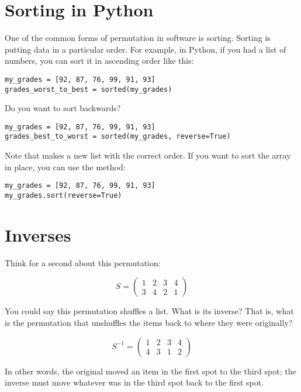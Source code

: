 \section{Sorting in Python}

One of the common forms of permutation in software is sorting.
Sorting is putting data in a particular order. For example, in Python,
if you had a list of numbers, you can sort it in ascending order like
this:

\begin{Verbatim}
my_grades = [92, 87, 76, 99, 91, 93]
grades_worst_to_best = sorted(my_grades)
\end{Verbatim}

Do you want to sort backwards?

\begin{Verbatim}
my_grades = [92, 87, 76, 99, 91, 93]
grades_best_to_worst = sorted(my_grades, reverse=True)
\end{Verbatim}

Note that  makes a new list with the correct
order. If you want to sort the array in place, you can use the
 method:

\begin{Verbatim}
my_grades = [92, 87, 76, 99, 91, 93]
my_grades.sort(reverse=True)
\end{Verbatim}

\section{Inverses}

Think for a second about this permutation:

$$S = \begin{pmatrix}
  1 & 2 & 3 & 4 \\
  3 & 4 & 2 & 1
\end{pmatrix}$$

You could say this permutation shuffles a list.  What is its
inverse? That is, what is the permutation that unshuffles the items
back to where they were originally?

$$S^{-1} = \begin{pmatrix}
  1 & 2 & 3 & 4 \\
  4 & 3 & 1 & 2
\end{pmatrix}$$

In other words, the original moved an item in the first spot to the third
spot; the inverse must move whatever was in the third spot back to
the first spot.

